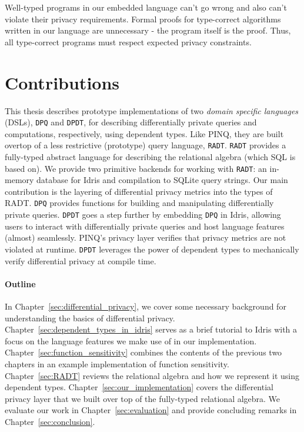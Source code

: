 \documentclass[12pt]{report}
\begin{document}
Well-typed programs in our embedded language can't go wrong and also can't violate their privacy requirements.
Formal proofs for type-correct algorithms written in our language are unnecessary - the program itself is the proof.
Thus, all type-correct programs must respect expected privacy constraints.

\section{Contributions}

This thesis describes prototype implementations of two \textit{domain specific languages} (DSLs), \texttt{DPQ} and \texttt{DPDT}, for describing differentially private queries and computations, respectively, using dependent types.
Like PINQ, they are built overtop of a less restrictive (prototype) query language, \texttt{RADT}.
\texttt{RADT} provides a fully-typed abstract language for describing the relational algebra (which SQL is based on).
We provide two primitive backends for working with \texttt{RADT}: an in-memory database for Idris and compilation to SQLite query strings.
Our main contribution is the layering of differential privacy metrics into the types of RADT.
\texttt{DPQ} provides functions for building and manipulating differentially private queries.
\texttt{DPDT} goes a step further by embedding \texttt{DPQ} in Idris, allowing users to interact with differentially private queries and host language features (almost) seamlessly.
PINQ's privacy layer verifies that privacy metrics are not violated at runtime.
\texttt{DPDT} leverages the power of dependent types to mechanically verify differential privacy at compile time.

\paragraph{Outline}


In Chapter~\ref{sec:differential_privacy}, we cover some necessary background for understanding the basics of differential privacy.
Chapter~\ref{sec:dependent_types_in_idris} serves as a brief tutorial to Idris with a focus on the language features we make use of in our implementation.
Chapter~\ref{sec:function_sensitivity} combines the contents of the previous two chapters in an example implementation of function sensitivity.
Chapter~\ref{sec:RADT} reviews the relational algebra and how we represent it using dependent types.
Chapter~\ref{sec:our_implementation} covers the differential privacy layer that we built over top of the fully-typed relational algebra.
We evaluate our work in Chapter~\ref{sec:evaluation} and provide concluding remarks in Chapter~\ref{sec:conclusion}.
\end{document}

